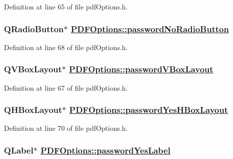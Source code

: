 Definition at line 65 of file pdf\-Options.h.\hypertarget{classPDFOptions_r29}{
\subsubsection[passwordNoRadioButton]{\setlength{\rightskip}{0pt plus 5cm}QRadio\-Button$\ast$ \hyperlink{classPDFOptions_r29}{PDFOptions::password\-No\-Radio\-Button}}}
\label{classPDFOptions_r29}


Definition at line 68 of file pdf\-Options.h.\hypertarget{classPDFOptions_r28}{
\subsubsection[passwordVBoxLayout]{\setlength{\rightskip}{0pt plus 5cm}QVBox\-Layout$\ast$ \hyperlink{classPDFOptions_r28}{PDFOptions::password\-VBox\-Layout}}}
\label{classPDFOptions_r28}


Definition at line 67 of file pdf\-Options.h.\hypertarget{classPDFOptions_r31}{
\subsubsection[passwordYesHBoxLayout]{\setlength{\rightskip}{0pt plus 5cm}QHBox\-Layout$\ast$ \hyperlink{classPDFOptions_r31}{PDFOptions::password\-Yes\-HBox\-Layout}}}
\label{classPDFOptions_r31}


Definition at line 70 of file pdf\-Options.h.\hypertarget{classPDFOptions_r32}{
\subsubsection[passwordYesLabel]{\setlength{\rightskip}{0pt plus 5cm}QLabel$\ast$ \hyperlink{classPDFOptions_r32}{PDFOptions::password\-Yes\-Label}}}
\label{classPDFOptions_r32}


